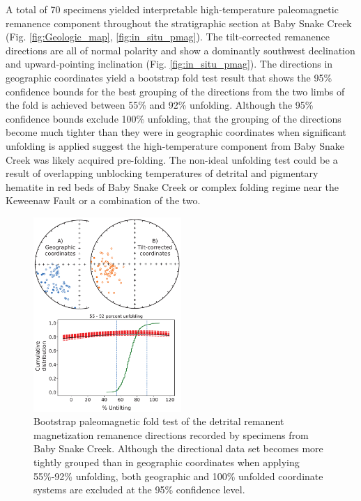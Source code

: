\documentclass[draft]{agujournal2019}
\begin{document}
A total of 70 specimens yielded interpretable high-temperature paleomagnetic remanence component throughout the stratigraphic section at Baby Snake Creek (Fig. \ref{fig:Geologic_map}, \ref{fig:in_situ_pmag}). The tilt-corrected remanence directions are all of normal polarity and show a dominantly southwest declination and upward-pointing inclination (Fig. \ref{fig:in_situ_pmag}). The directions in geographic coordinates yield a bootstrap fold test \cite{Tauxe1994a} result that shows the 95\% confidence bounds for the best grouping of the directions from the two limbs of the fold is achieved between 55\% and 92\% unfolding. Although the 95\% confidence bounds exclude 100\% unfolding, that the grouping of the directions become much tighter than they were in geographic coordinates when significant unfolding is applied suggest the high-temperature component from Baby Snake Creek was likely acquired pre-folding. The non-ideal unfolding test could be a result of overlapping unblocking temperatures of detrital and pigmentary hematite in red beds of Baby Snake Creek or complex folding regime near the Keweenaw Fault or a combination of the two. 

\begin{figure}
\centering
\includegraphics[width=0.5\textwidth]{SC1_fold_test.pdf}
\caption{Bootstrap paleomagnetic fold test \cite{Tauxe1994a} of the detrital remanent magnetization remanence directions recorded by specimens from Baby Snake Creek. Although the directional data set becomes more tightly grouped than in geographic coordinates when applying 55\%-92\% unfolding, both geographic and 100\% unfolded coordinate systems are excluded at the 95\% confidence level. }
\label{fig:Intraclast_pmag}
\end{figure}
\end{document}
